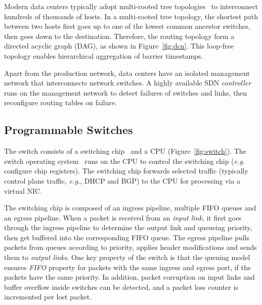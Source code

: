 Modern data centers typically adopt multi-rooted tree topologies~\cite{leiserson1985fat,greenberg2009vl2} to interconnect hundreds of thousands of hosts. In a multi-rooted tree topology, the shortest path between two hosts first goes up to one of the lowest common ancestor switches, then goes down to the destination.
Therefore, the routing topology form a directed acyclic graph (DAG), as shown in Figure~\ref{fig:dcn}.
This loop-free topology enables hierarchical aggregation of barrier timestamps.

Apart from the production network, data centers have an isolated management network that interconnects network switches.
A highly available SDN \emph{controller} runs on the management network to detect failures of switches and links, then reconfigure routing tables on failure.


\subsection{Programmable Switches}
\label{sec:programmable-switches}
The switch consists of a switching chip~\cite{broadcom,tofino} and a CPU (Figure~\ref{fig:switch}). The switch operating system~\cite{arista-eos} runs on the CPU to control the switching chip (\textit{e.g.} configure chip registers). The switching chip forwards selected traffic (typically control plane traffic, \textit{e.g.}, DHCP and BGP) to the CPU for processing via a virtual NIC. 

The switching chip is composed of an ingress pipeline, multiple FIFO queues and an egress pipeline.
When a packet is received from an \textit{input link}, it first goes through the ingress pipeline to determine the output link and queueing priority, then get buffered into the corresponding FIFO queue.
The egress pipeline pulls packets from queues according to priority, applies header modifications and sends them to \textit{output links}.
One key property of the switch is that the queuing model ensures \emph{FIFO} property for packets with the same ingress and egress port, 
if the packets have the same priority. In addition, packet corruption on input links and buffer overflow inside switches can be detected, and a packet loss counter is incremented per lost packet.

